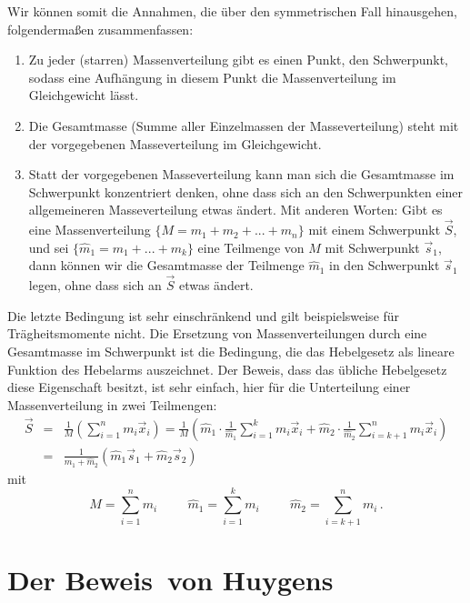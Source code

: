 Wir k\"onnen somit die Annahmen, die \"uber den symmetrischen Fall hinausgehen,
folgenderma\ss en zusammenfassen:
\begin{enumerate}
\item
Zu jeder (starren) Massenverteilung gibt es einen Punkt, den Schwerpunkt, sodass eine
Aufh\"angung in diesem Punkt die Massenverteilung im Gleichgewicht l\"asst.
\item
Die Gesamtmasse (Summe aller Einzelmassen der Masseverteilung) steht mit der
vorgegebenen Masseverteilung im Gleichgewicht.
\item
Statt der vorgegebenen Masseverteilung kann man sich die Gesamtmasse im 
Schwerpunkt konzentriert denken, ohne dass sich an den Schwerpunkten einer
allgemeineren Masseverteilung etwas \"andert. Mit anderen Worten: Gibt es eine
Massenverteilung $\{M= m_1 + m_2 +... +m_n\}$ mit einem Schwerpunkt $\vec{S}$, und sei
$\{\hat{m}_1=m_1 +... +m_k\}$ eine Teilmenge von $M$ mit Schwerpunkt $\vec{s}_1$, dann
k\"onnen wir die Gesamtmasse der Teilmenge $\hat{m}_1$ in den Schwerpunkt $\vec{s}_1$ legen,
ohne dass sich an $\vec{S}$ etwas \"andert.
\end{enumerate}
Die letzte Bedingung ist sehr einschr\"ankend und gilt beispielsweise f\"ur
Tr\"agheitsmomente nicht. Die Ersetzung von Massenverteilungen durch eine Gesamtmasse
im Schwerpunkt ist die Bedingung, die das Hebelgesetz als lineare Funktion des Hebelarms
auszeichnet. Der Beweis, dass das \"ubliche Hebelgesetz diese Eigenschaft besitzt, ist sehr einfach,
hier f\"ur die Unterteilung einer Massenverteilung in zwei Teilmengen:
\begin{eqnarray}
    \vec{S} &=& \frac{1}{M}  \left( \sum_{i=1}^n m_i \vec{x}_i \right) 
          = \frac{1}{M}  \left(  \hat{m}_1 \cdot \frac{1}{\hat{m}_1} \sum_{i=1}^k m_i \vec{x}_i +
              \hat{m}_2 \cdot \frac{1}{\hat{m}_2} \sum_{i=k+1}^n m_i \vec{x}_i \right)  \\
          &=&  \frac{1}{\hat{m}_1+\hat{m}_2} \left(  \hat{m}_1 \vec{s}_1 +
              \hat{m}_2  \vec{s}_2 \right)     
\end{eqnarray}
mit
\begin{equation}
      M =   \sum_{i=1}^n m_i \hspace{1cm}  \hat{m}_1= \sum_{i=1}^k m_i  \hspace{1cm}  \hat{m}_2= \sum_{i=k+1}^n m_i \, .
\end{equation}

\section{Der \glqq Beweis\grqq\ von Huygens}

